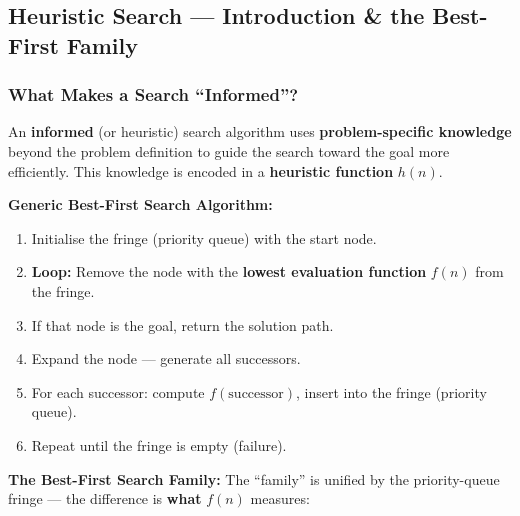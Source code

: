 \documentclass[12pt, a4paper]{article}
\begin{document}
\subsection{Heuristic Search — Introduction \& the Best-First Family}

\subsubsection*{What Makes a Search ``Informed''?}

\noindent An \textbf{informed} (or heuristic) search algorithm uses \textbf{problem-specific knowledge} beyond the problem definition to guide the search toward the goal more efficiently. This knowledge is encoded in a \textbf{heuristic function} $h(n)$.

\vspace{0.4em}
\noindent\textbf{Generic Best-First Search Algorithm:}

\begin{enumerate}[leftmargin=1.5cm, itemsep=4pt]
  \item Initialise the fringe (priority queue) with the start node.
  \item \textbf{Loop:} Remove the node with the \textbf{lowest evaluation function} $f(n)$ from the fringe.
  \item If that node is the goal, return the solution path.
  \item Expand the node — generate all successors.
  \item For each successor: compute $f(\text{successor})$, insert into the fringe (priority queue).
  \item Repeat until the fringe is empty (failure).
\end{enumerate}

\noindent\textbf{The Best-First Search Family:} The ``family'' is unified by the priority-queue fringe — the difference is \textbf{what} $f(n)$ measures:
\end{document}
